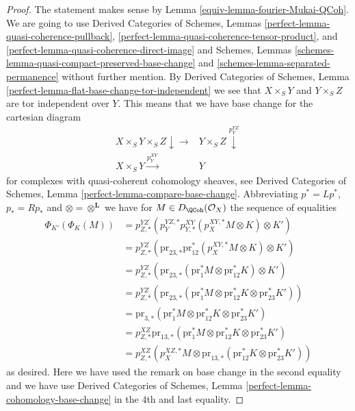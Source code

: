\begin{proof}

The statement makes sense by Lemma \ref{equiv-lemma-fourier-Mukai-QCoh}.
We are going to use
Derived Categories of Schemes, Lemmas
\ref{perfect-lemma-quasi-coherence-pullback},
\ref{perfect-lemma-quasi-coherence-tensor-product}, and
\ref{perfect-lemma-quasi-coherence-direct-image}
and Schemes, Lemmas
\ref{schemes-lemma-quasi-compact-preserved-base-change} and
\ref{schemes-lemma-separated-permanence}
without further mention.
By Derived Categories of Schemes, Lemma
\ref{perfect-lemma-flat-base-change-tor-independent}
we see that $X \times_S Y$ and $Y \times_S Z$ are tor independent
over $Y$. This means that we have base change for the cartesian diagram
$$
\begin{array}{cc}X \times_S Y \times_S Z \downarrow\longrightarrow & Y \times_S Z \overset{p^{YZ}_Y}{\downarrow} \\ X \times_S Y \overset{p^{XY}_Y}{\longrightarrow} & Y\end{array}
$$
for complexes with quasi-coherent cohomology sheaves, see
Derived Categories of Schemes, Lemma \ref{perfect-lemma-compare-base-change}.
Abbreviating $p^* = Lp^*$, $p_* = Rp_*$ and $\otimes = \otimes^\mathbf{L}$
we have for $M \in D_\QCoh(\mathcal{O}_X)$ the sequence of equalities
\begin{align*}
\Phi_{K'}(\Phi_K(M))
& =
p^{YZ}_{Z, *}(p^{YZ, *}_Y p^{XY}_{Y, *}(p^{XY, *}_X M \otimes K) \otimes K') \\
& =
p^{YZ}_{Z, *}(\text{pr}_{23, *} \text{pr}_{12}^*(p^{XY, *}_X M \otimes K)
\otimes K') \\
& =
p^{YZ}_{Z, *}(\text{pr}_{23, *}(\text{pr}_1^*M \otimes \text{pr}_{12}^*K)
\otimes K') \\
& =
p^{YZ}_{Z, *}(\text{pr}_{23, *}(\text{pr}_1^*M \otimes \text{pr}_{12}^*K
\otimes \text{pr}_{23}^*K')) \\
& =
\text{pr}_{3, *}(\text{pr}_1^*M \otimes \text{pr}_{12}^*K
\otimes \text{pr}_{23}^*K') \\
& =
p^{XZ}_{Z, *}\text{pr}_{13, *}(\text{pr}_1^*M \otimes \text{pr}_{12}^*K
\otimes \text{pr}_{23}^*K') \\
& =
p^{XZ}_{Z, *} (p^{XZ, *}_X M \otimes \text{pr}_{13, *}(\text{pr}_{12}^*K
\otimes \text{pr}_{23}^*K'))
\end{align*}
as desired. Here we have used the remark on base change in the
second equality and we have use Derived Categories of Schemes, Lemma
\ref{perfect-lemma-cohomology-base-change} in the $4$th and
last equality.
\end{proof}

